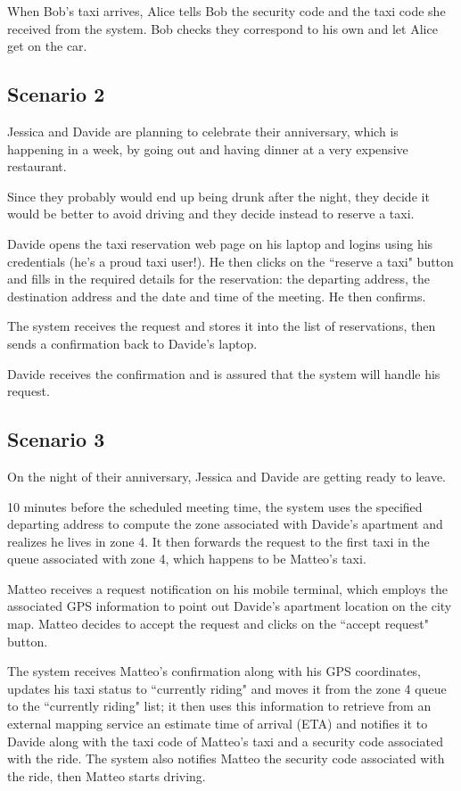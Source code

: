 When Bob's taxi arrives, Alice tells Bob the security code and the taxi code she received from the system. Bob checks they correspond to his own and let Alice get on the car.


\subsection{Scenario 2}
Jessica and Davide are planning to celebrate their anniversary, which is happening in a week, by going out and having dinner at a very expensive restaurant.

Since they probably would end up being drunk after the night, they decide it would be better to avoid driving and they decide instead to reserve a taxi.

Davide opens the taxi reservation web page on his laptop and logins using his credentials (he's a proud taxi user!). He then clicks on the ``reserve a taxi" button and fills in the required details for the reservation: the departing address, the destination address and the date and time of the meeting. He then confirms.

The system receives the request and stores it into the list of reservations, then sends a confirmation back to Davide's laptop.

Davide receives the confirmation and is assured that the system will handle his request.


\subsection{Scenario 3}
On the night of their anniversary, Jessica and Davide are getting ready to leave.

10 minutes before the scheduled meeting time, the system uses the specified departing address to compute the zone associated with Davide's apartment and realizes he lives in zone 4. It then forwards the request to the first taxi in the queue associated with zone 4, which happens to be Matteo's taxi.

Matteo receives a request notification on his mobile terminal, which employs the associated GPS information to point out Davide's apartment location on the city map. Matteo decides to accept the request and clicks on the ``accept request" button.

The system receives Matteo's confirmation along with his GPS coordinates, updates his taxi status to ``currently riding" and moves it from the zone 4 queue to the ``currently riding" list; it then uses this information to retrieve from an external mapping service an estimate time of arrival (ETA) and notifies it to Davide along with the taxi code of Matteo's taxi and a security code associated with the ride. The system also notifies Matteo the security code associated with the ride, then Matteo starts driving.

